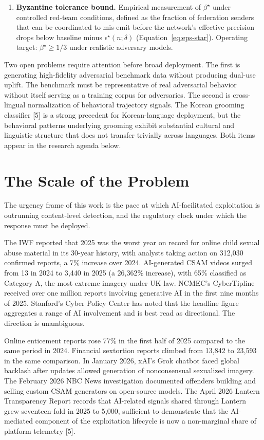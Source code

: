 \documentclass[11pt]{article}
\begin{document}
\begin{enumerate}[label=(M\arabic*), leftmargin=2.4em]
\item \textbf{Byzantine tolerance bound.} Empirical measurement of $\beta^\star$ under controlled red-team conditions, defined as the fraction of federation senders that can be coordinated to mis-emit before the network's effective precision drops below baseline minus $\epsilon^\star(n; \delta)$ (Equation~\eqref{eq:eps-star}). Operating target: $\beta^\star \geq 1/3$ under realistic adversary models.
\end{enumerate}

Two open problems require attention before broad deployment. The first is generating high-fidelity adversarial benchmark data without producing dual-use uplift. The benchmark must be representative of real adversarial behavior without itself serving as a training corpus for adversaries. The second is cross-lingual normalization of behavioral trajectory signals. The Korean grooming classifier [5] is a strong precedent for Korean-language deployment, but the behavioral patterns underlying grooming exhibit substantial cultural and linguistic structure that does not transfer trivially across languages. Both items appear in the research agenda below.

\section{The Scale of the Problem}
\label{sec:scale}

The urgency frame of this work is the pace at which AI-facilitated exploitation is outrunning content-level detection, and the regulatory clock under which the response must be deployed.

The IWF reported that 2025 was the worst year on record for online child sexual abuse material in its 30-year history, with analysts taking action on 312{,}030 confirmed reports, a 7\% increase over 2024. AI-generated CSAM videos surged from 13 in 2024 to 3{,}440 in 2025 (a 26{,}362\% increase), with 65\% classified as Category A, the most extreme imagery under UK law. NCMEC's CyberTipline received over one million reports involving generative AI in the first nine months of 2025. Stanford's Cyber Policy Center has noted that the headline figure aggregates a range of AI involvement and is best read as directional. The direction is unambiguous.

Online enticement reports rose 77\% in the first half of 2025 compared to the same period in 2024. Financial sextortion reports climbed from 13{,}842 to 23{,}593 in the same comparison. In January 2026, xAI's Grok chatbot faced global backlash after updates allowed generation of nonconsensual sexualized imagery. The February 2026 NBC News investigation documented offenders building and selling custom CSAM generators on open-source models. The April 2026 Lantern Transparency Report records that AI-related signals shared through Lantern grew seventeen-fold in 2025 to 5{,}000, sufficient to demonstrate that the AI-mediated component of the exploitation lifecycle is now a non-marginal share of platform telemetry [5].
\end{document}

